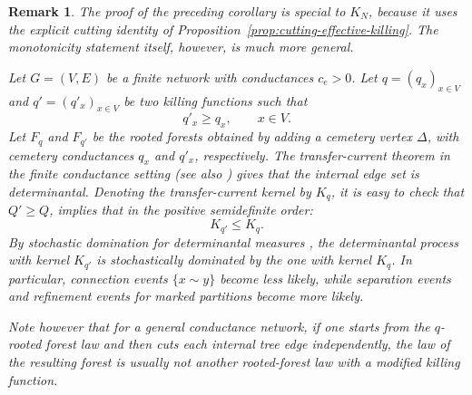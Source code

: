\documentclass[11pt]{article}
\newtheorem{remark}{Remark}[section]
\begin{document}
\begin{remark}
The proof of the preceding corollary is special to \(K_N\), because it uses the explicit
cutting identity of Proposition~\ref{prop:cutting-effective-killing}. The
monotonicity statement itself, however, is much more general.

Let \(G=(V,E)\) be a finite network with conductances \(c_e>0\). Let
\(q=(q_x)_{x\in V}\) and \(q'=(q'_x)_{x\in V}\) be two killing functions such
that
\[
q'_x\ge q_x,\qquad x\in V.
\]
Let \(F_q\) and \(F_{q'}\) be the rooted forests obtained by adding a cemetery
vertex \(\Delta\), with cemetery conductances \(q_x\) and \(q'_x\),
respectively. 
The transfer-current theorem in the finite conductance setting
\cite[\S8.3]{stfl} (see also \cite{BurtonPemantle1993} ) gives that the internal edge set is determinantal. Denoting the
 transfer-current
kernel by $K_q$, it is easy to check that  \(Q'\ge Q\), implies that 
in the positive semidefinite order:
\[
K_{q'}\le K_q .
\]
By stochastic domination for determinantal measures
\cite{LyonsDPM}, the determinantal process with kernel \(K_{q'}\) is
stochastically dominated by the one with kernel \(K_q\). In particular, connection events
\(\{x\sim y\}\) become less likely, while separation events and refinement
events for marked partitions become more likely.

Note however that for a general conductance network, if one starts from the
\(q\)-rooted forest law and then cuts each internal tree edge independently,
the law of the resulting forest is usually not another rooted-forest law with
a modified killing function. 
\end{remark}
\end{document}

